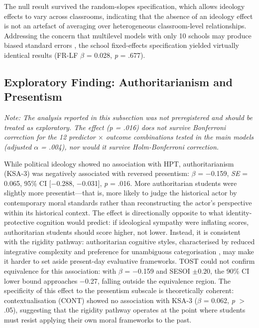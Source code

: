 \documentclass[referee,pdflatex,sn-apa]{sn-jnl}
\begin{document}
The null result survived the random-slopes specification, which allows ideology effects to vary across classrooms, indicating that the absence of an ideology effect is not an artefact of averaging over heterogeneous classroom-level relationships. Addressing the concern that multilevel models with only 10 schools may produce biased standard errors \citep{Maas2005}, the school fixed-effects specification yielded virtually identical results (FR-LF $\beta$ = 0.028, \textit{p} = .677).

\subsection{Exploratory Finding: Authoritarianism and Presentism}\label{subsec:rigidity}

\textit{Note: The analysis reported in this subsection was not preregistered and should be treated as exploratory. The effect (p = .016) does not survive Bonferroni correction for the 12 predictor $\times$ outcome combinations tested in the main models (adjusted $\alpha$ = .004), nor would it survive Holm-Bonferroni correction.}

While political ideology showed no association with HPT, authoritarianism (KSA-3) was negatively associated with reversed presentism: $\beta$ = $-$0.159, \textit{SE} = 0.065, 95\% CI [$-$0.288, $-$0.031], \textit{p} = .016. More authoritarian students were slightly more presentist---that is, more likely to judge the historical actor by contemporary moral standards rather than reconstructing the actor's perspective within its historical context. The effect is directionally opposite to what identity-protective cognition would predict: if ideological sympathy were inflating scores, authoritarian students should score higher, not lower. Instead, it is consistent with the rigidity pathway: authoritarian cognitive styles, characterised by reduced integrative complexity and preference for unambiguous categorisation \citep{Duckitt2001,Suedfeld1977}, may make it harder to set aside present-day evaluative frameworks. TOST could not confirm equivalence for this association: with $\beta$ = $-$0.159 and SESOI $\pm 0.20$, the 90\% CI lower bound approaches $-$0.27, falling outside the equivalence region. The specificity of this effect to the presentism subscale is theoretically coherent: contextualisation (CONT) showed no association with KSA-3 ($\beta$ = 0.062, \textit{p} $>$ .05), suggesting that the rigidity pathway operates at the point where students must resist applying their own moral frameworks to the past.
\end{document}
